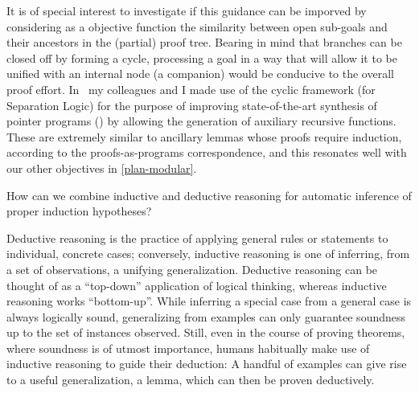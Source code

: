 It is of special interest to investigate if this guidance can be imporved by considering as a objective function the similarity between open sub-goals and their ancestors in the (partial) proof tree.
Bearing in mind that branches can be closed off by forming a cycle, processing a goal in a way that will allow it to be unified with an internal node (a companion) would be conducive to the overall proof effort.
In~\cite{cypress} my colleagues and I made use of the cyclic framework (for Separation Logic) for the purpose of improving state-of-the-art synthesis of pointer programs (\cite{suslik}) by allowing the generation of auxiliary recursive functions.
These are extremely similar to ancillary lemmas whose proofs require induction, according to the proofs-as-programs correspondence, and this resonates well with our other objectives in \autoref{plan-modular}.


\begin{researchquestion}How can we combine inductive and deductive reasoning for automatic inference of proper induction hypotheses?
\end{researchquestion}

Deductive reasoning is the practice of applying general rules or statements to
individual, concrete cases; conversely, inductive reasoning is one of inferring,
from a set of observations, a unifying generalization.
Deductive reasoning can be thought of as a ``top-down'' application of logical
thinking, whereas inductive reasoning works ``bottom-up''.
While inferring a special case from a general case is always logically sound,
generalizing from examples can only guarantee soundness up to the set of
instances observed.
Still, even in the course of proving theorems, where soundness is of utmost
importance, humans habitually make use of inductive reasoning to guide their
deduction:
A handful of examples can give rise to a useful generalization, a lemma,
which can then be proven deductively.


